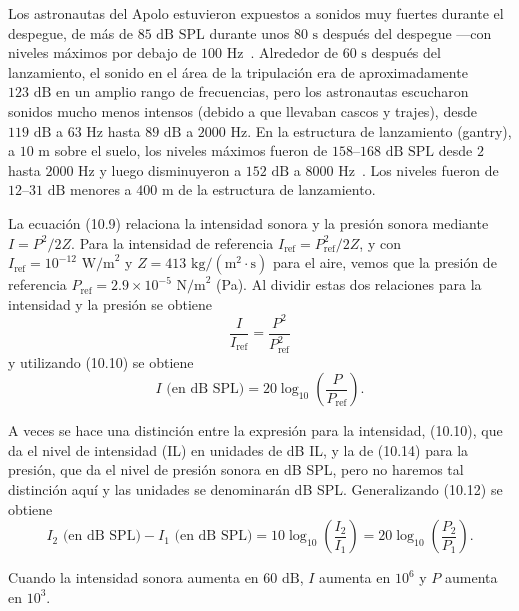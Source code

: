 \documentclass[12pt]{book}
\begin{document}
Los astronautas del Apolo estuvieron expuestos a sonidos muy fuertes durante el despegue, de más de $85\text{ dB SPL}$ durante unos $80\text{ s}$ después del despegue ---con niveles máximos por debajo de $100\text{ Hz}$~\cite{25, 37}. Alrededor de $60\text{ s}$ después del lanzamiento, el sonido en el área de la tripulación era de aproximadamente $123\text{ dB}$ en un amplio rango de frecuencias, pero los astronautas escucharon sonidos mucho menos intensos (debido a que llevaban cascos y trajes), desde $119\text{ dB}$ a $63\text{ Hz}$ hasta $89\text{ dB}$ a $2000\text{ Hz}$. En la estructura de lanzamiento (gantry), a $10\text{ m}$ sobre el suelo, los niveles máximos fueron de $158\text{--}168\text{ dB SPL}$ desde $2$ hasta $2000\text{ Hz}$ y luego disminuyeron a $152\text{ dB}$ a $8000\text{ Hz}$~\cite{37, 39}. Los niveles fueron de $12\text{--}31\text{ dB}$ menores a $400\text{ m}$ de la estructura de lanzamiento.

La ecuación (10.9) relaciona la intensidad sonora y la presión sonora mediante $I = P^2/2Z$. Para la intensidad de referencia $I_{\text{ref}} = P_{\text{ref}}^2/2Z$, y con $I_{\text{ref}} = 10^{-12}\text{ W/m}^2$ y $Z = 413\text{ kg/}(\text{m}^2\cdot\text{s})$ para el aire, vemos que la presión de referencia $P_{\text{ref}} = 2.9 \times 10^{-5}\text{ N/m}^2$ (Pa). Al dividir estas dos relaciones para la intensidad y la presión se obtiene
\begin{equation}
\frac{I}{I_{\text{ref}}} = \frac{P^2}{P_{\text{ref}}^2}
\label{eq:10.13}
\end{equation}
y utilizando (10.10) se obtiene
\begin{equation}
I\text{ (en dB SPL)} = 20\log_{10}\left(\frac{P}{P_{\text{ref}}}\right).
\label{eq:10.14}
\end{equation}

A veces se hace una distinción entre la expresión para la intensidad, (10.10), que da el nivel de intensidad (IL) en unidades de dB IL, y la de (10.14) para la presión, que da el nivel de presión sonora en dB SPL, pero no haremos tal distinción aquí y las unidades se denominarán dB SPL. Generalizando (10.12) se obtiene
\begin{equation}
I_2\text{ (en dB SPL)} - I_1\text{ (en dB SPL)} = 10\log_{10}\left(\frac{I_2}{I_1}\right) = 20\log_{10}\left(\frac{P_2}{P_1}\right).
\label{eq:10.15}
\end{equation}

Cuando la intensidad sonora aumenta en $60\text{ dB}$, $I$ aumenta en $10^6$ y $P$ aumenta en $10^3$.
\end{document}
